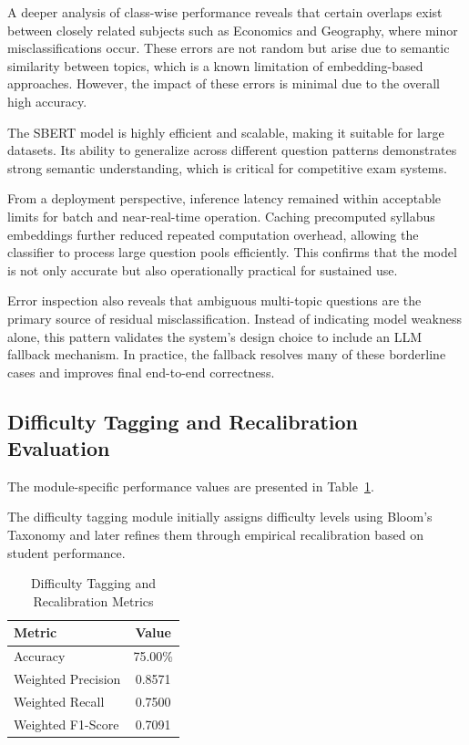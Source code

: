 \begin{sloppypar}
A deeper analysis of class-wise performance reveals that certain overlaps exist between closely related subjects such as Economics and Geography, where minor misclassifications occur. These errors are not random but arise due to semantic similarity between topics, which is a known limitation of embedding-based approaches. However, the impact of these errors is minimal due to the overall high accuracy.

The SBERT model is highly efficient and scalable, making it suitable for large datasets. Its ability to generalize across different question patterns demonstrates strong semantic understanding, which is critical for competitive exam systems.

From a deployment perspective, inference latency remained within acceptable limits for batch and near-real-time operation. Caching precomputed syllabus embeddings further reduced repeated computation overhead, allowing the classifier to process large question pools efficiently. This confirms that the model is not only accurate but also operationally practical for sustained use.

Error inspection also reveals that ambiguous multi-topic questions are the primary source of residual misclassification. Instead of indicating model weakness alone, this pattern validates the system's design choice to include an LLM fallback mechanism. In practice, the fallback resolves many of these borderline cases and improves final end-to-end correctness.

\subsection{Difficulty Tagging and Recalibration Evaluation}

The module-specific performance values are presented in Table~\ref{tab:difficulty_tagging_metrics}.

The difficulty tagging module initially assigns difficulty levels using Bloom's Taxonomy and later refines them through empirical recalibration based on student performance.

\begin{table}[H]
\centering
\caption{Difficulty Tagging and Recalibration Metrics}
\label{tab:difficulty_tagging_metrics}
\begin{tabular}{|l|c|}
\hline
Metric & Value \\
\hline
Accuracy & 75.00\% \\
\hline
Weighted Precision & 0.8571 \\
\hline
Weighted Recall & 0.7500 \\
\hline
Weighted F1-Score & 0.7091 \\
\hline
\end{tabular}
\end{table}


\end{sloppypar}
